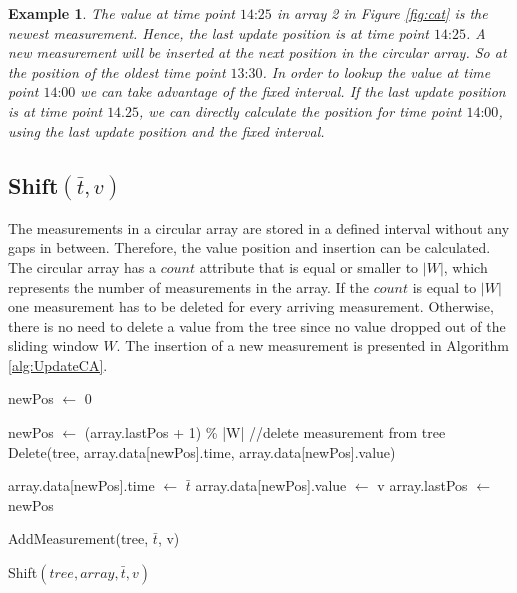 \documentclass[abstracton,12pt,oneside]{scrreprt}
\newtheorem{example}{Example}
\begin{document}
\begin{example}
	The value at time point $\text{14:25}$ in array 2 in Figure \ref{fig:cat} is the newest measurement. Hence, the last update position is at time point $\text{14:25}$. A new measurement will be inserted at the next position in the circular array. So at the position of the oldest time point $\text{13:30}$. In order to lookup the value at time point $\text{14:00}$ we can take advantage of the fixed interval. If the last update position is at time point $\text{14.25}$, we can directly calculate the position for time point $\text{14:00}$, using the last update position and the fixed interval.
\end{example} 

\subsection{Shift$(\bar{t}, v)$}

The measurements in a circular array are stored in a defined interval without any gaps in between. Therefore, the value position and insertion can be calculated. The circular array has a $count$ attribute that is equal or smaller to $|W|$, which represents the number of measurements in the array. If the $count$ is equal to $|W|$ one measurement has to be deleted for every arriving measurement. Otherwise, there is no need to delete a value from the tree since no value dropped out of the sliding window $W$. The insertion of a new measurement is presented in Algorithm \ref{alg:UpdateCA}.

\BlankLine
\begin{algorithm}[H]
	\IncMargin{1em}
	\SetAlgoLined
	\DontPrintSemicolon
	
	
	newPos $\leftarrow$ 0\;
	
	{
		newPos $\leftarrow$ (array.lastPos + 1) \% |W|\;
		//delete measurement from tree\;
		Delete(tree, array.data[newPos].time, array.data[newPos].value)\;
		
	}
	
	array.data[newPos].time $\leftarrow$ $\bar{t}$\;
	array.data[newPos].value $\leftarrow$ v\;
	array.lastPos $\leftarrow$ newPos\;
	
	AddMeasurement(tree, $\bar{t}$, v)\;
	
	
	\caption{Shift$(tree, array, \bar{t}, v)$}
	\label{alg:UpdateCA}
\end{algorithm}
\end{document}
